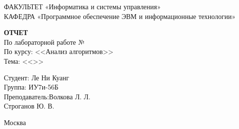 \begin{titlepage}
	{\doublespacing \small \raggedright ФАКУЛЬТЕТ \hspace{25mm} «Информатика и системы управления»\\
	КАФЕДРА \hspace{5mm} «Программное обеспечение ЭВМ и информационные технологии»\\}

	\vspace{30mm}
	
	\textbf{ОТЧЕТ}\\
	По лабораторной работе №\lab\\
	По курсу: <<Анализ алгоритмов>>\\
	Тема: <<\topic>>\\

	\vspace{60mm}

	\hspace{70mm} Студент:      \hfill Ле Ни Куанг\\
	\hspace{70mm} Группа:       \hfill ИУ7и-56Б\\
	\hspace{70mm} Преподаватель:\hfill Волкова Л. Л.\\
								\hfill Строганов Ю. В.\\

	\vfill
	
	Москва\\
	\the\year
\end{titlepage}
